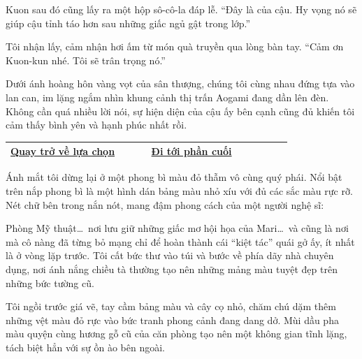 \documentclass[../main.tex]{subfiles}
\begin{document}
Kuon sau đó cũng lấy ra một hộp sô-cô-la đáp lễ. ``Đây là của cậu. Hy vọng nó sẽ giúp cậu tỉnh táo hơn sau những giấc ngủ gật trong lớp.''

Tôi nhận lấy, cảm nhận hơi ấm từ món quà truyền qua lòng bàn tay. ``Cảm ơn Kuon-kun nhé. Tôi sẽ trân trọng nó.''

Dưới ánh hoàng hôn vàng vọt của sân thượng, chúng tôi cùng nhau đứng tựa vào lan can, im lặng ngắm nhìn khung cảnh thị trấn Aogami đang dần lên đèn. Không cần quá nhiều lời nói, sự hiện diện của cậu ấy bên cạnh cũng đủ khiến tôi cảm thấy bình yên và hạnh phúc nhất rồi.

\begin{table}[H]
  \centering
  \setlength{\arrayrulewidth}{1pt}
  \begin{tabular}{|>{\centering\arraybackslash}p{0.4\linewidth}|>{\centering\arraybackslash}p{0.4\linewidth}|}
    \hline
    \hyperref[choice]{Quay trở về lựa chọn} & \hyperref[ending]{Đi tới phần cuối} \\ \hline
  \end{tabular}
\end{table}

\newpage
\label{mari}

Ánh mắt tôi dừng lại ở một phong bì màu đỏ thẫm vô cùng quý phái. Nổi bật trên nắp phong bì là một hình dán bảng màu nhỏ xíu với đủ các sắc màu rực rỡ. Nét chữ bên trong nắn nót, mang đậm phong cách của một người nghệ sĩ:


Phòng Mỹ thuật\dots\ nơi lưu giữ những giấc mơ hội họa của Mari\dots\ và cũng là nơi mà cô nàng đã từng bỏ mạng chỉ để hoàn thành cái ``kiệt tác'' quái gở ấy, ít nhất là ở vòng lặp trước. Tôi cất bức thư vào túi và bước về phía dãy nhà chuyên dụng, nơi ánh nắng chiều tà thường tạo nên những mảng màu tuyệt đẹp trên những bức tường cũ.

\ct


Tôi ngồi trước giá vẽ, tay cầm bảng màu và cây cọ nhỏ, chăm chú dặm thêm những vệt màu đỏ rực vào bức tranh phong cảnh đang dang dở. Mùi dầu pha màu quyện cùng hương gỗ cũ của căn phòng tạo nên một không gian tĩnh lặng, tách biệt hẳn với sự ồn ào bên ngoài.
\end{document}
